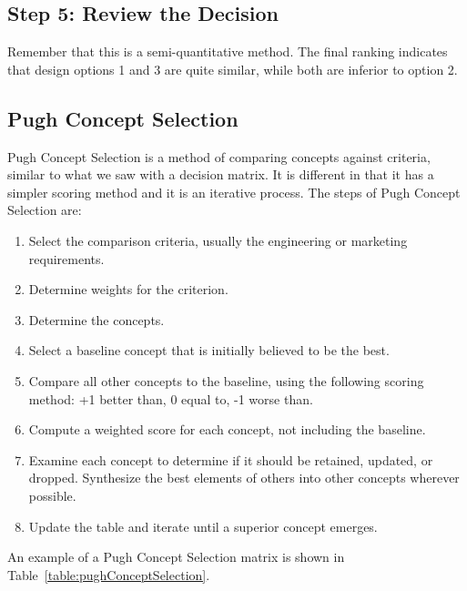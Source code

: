 \subsection*{Step 5: Review the Decision}
\label{subsection:step-5-review-the-decision}


Remember that this is a semi-quantitative method. The final ranking
indicates that design options 1 and 3 are quite similar, while both are
inferior to option 2.

\subsection{Pugh Concept Selection}
\label{subsection:pugh-concept-selection}

Pugh Concept Selection is a method of comparing concepts against
criteria, similar to what we saw with a decision matrix. It is different
in that it has a simpler scoring method and it is an iterative process.
The steps of Pugh Concept Selection are:

\begin{enumerate}
\def\labelenumi{\arabic{enumi}.}
\item
  Select the comparison criteria, usually the engineering or marketing
  requirements.
\item
  Determine weights for the criterion.
\item
  Determine the concepts.
\item
  Select a baseline concept that is initially believed to be the best.
\item
  Compare all other concepts to the baseline, using the following
  scoring method: +1 better than, 0 equal to, -1 worse than.
\item
  Compute a weighted score for each concept, not including the baseline.
\item
  Examine each concept to determine if it should be retained, updated,
  or dropped. Synthesize the best elements of others into other concepts
  wherever possible.
\item
  Update the table and iterate until a superior concept emerges.
\end{enumerate}

An example of a Pugh Concept Selection matrix is shown in 
Table~\ref{table:pughConceptSelection}.


